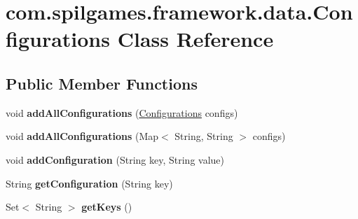 \hypertarget{classcom_1_1spilgames_1_1framework_1_1data_1_1_configurations}{\section{com.\-spilgames.\-framework.\-data.\-Configurations Class Reference}
\label{classcom_1_1spilgames_1_1framework_1_1data_1_1_configurations}
}
\subsection*{Public Member Functions}
\begin{DoxyCompactItemize}
\item 
\hypertarget{classcom_1_1spilgames_1_1framework_1_1data_1_1_configurations_a5a51006ea24059a8920f8800646960db}{void {\bfseries add\-All\-Configurations} (\hyperlink{classcom_1_1spilgames_1_1framework_1_1data_1_1_configurations}{Configurations} configs)}\label{classcom_1_1spilgames_1_1framework_1_1data_1_1_configurations_a5a51006ea24059a8920f8800646960db}

\item 
\hypertarget{classcom_1_1spilgames_1_1framework_1_1data_1_1_configurations_ac7d56f2287aab485c3ba6cf7f868b299}{void {\bfseries add\-All\-Configurations} (Map$<$ String, String $>$ configs)}\label{classcom_1_1spilgames_1_1framework_1_1data_1_1_configurations_ac7d56f2287aab485c3ba6cf7f868b299}

\item 
\hypertarget{classcom_1_1spilgames_1_1framework_1_1data_1_1_configurations_a55defa46a4aca5ddb7343fc50fc894e0}{void {\bfseries add\-Configuration} (String key, String value)}\label{classcom_1_1spilgames_1_1framework_1_1data_1_1_configurations_a55defa46a4aca5ddb7343fc50fc894e0}

\item 
\hypertarget{classcom_1_1spilgames_1_1framework_1_1data_1_1_configurations_ad953253bb1d4e67390b96a5381fc4a7b}{String {\bfseries get\-Configuration} (String key)}\label{classcom_1_1spilgames_1_1framework_1_1data_1_1_configurations_ad953253bb1d4e67390b96a5381fc4a7b}

\item 
\hypertarget{classcom_1_1spilgames_1_1framework_1_1data_1_1_configurations_a258cdb48061eb02a06984e800cd92884}{Set$<$ String $>$ {\bfseries get\-Keys} ()}\label{classcom_1_1spilgames_1_1framework_1_1data_1_1_configurations_a258cdb48061eb02a06984e800cd92884}


\end{DoxyCompactItemize}

